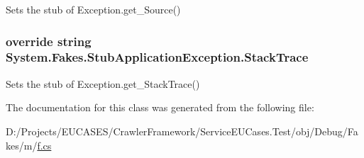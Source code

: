 Sets the stub of Exception.\-get\-\_\-\-Source()

\hypertarget{class_system_1_1_fakes_1_1_stub_application_exception_a0dd75eead80df26b41b06c0d698d18b4}{
\subsubsection[{Stack\-Trace}]{\setlength{\rightskip}{0pt plus 5cm}override string System.\-Fakes.\-Stub\-Application\-Exception.\-Stack\-Trace\hspace{0.3cm}{\ttfamily [get]}}}\label{class_system_1_1_fakes_1_1_stub_application_exception_a0dd75eead80df26b41b06c0d698d18b4}


Sets the stub of Exception.\-get\-\_\-\-Stack\-Trace()



The documentation for this class was generated from the following file\-:\begin{DoxyCompactItemize}
\item 
D\-:/\-Projects/\-E\-U\-C\-A\-S\-E\-S/\-Crawler\-Framework/\-Service\-E\-U\-Cases.\-Test/obj/\-Debug/\-Fakes/m/\hyperlink{m_2f_8cs}{f.\-cs}\end{DoxyCompactItemize}
